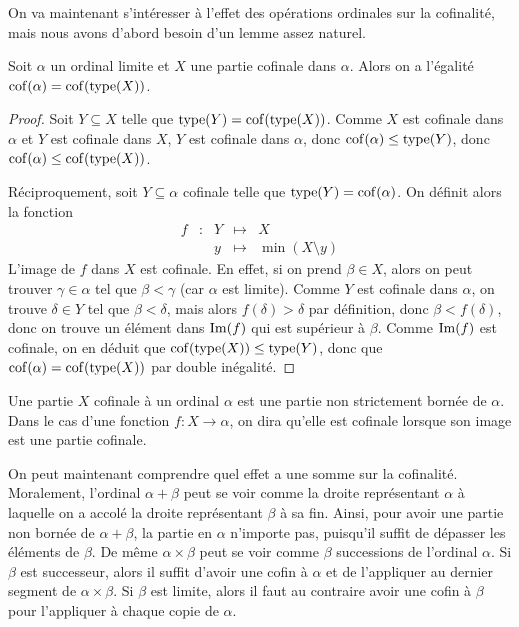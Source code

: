 On va maintenant s'intéresser à l'effet des opérations ordinales sur la
cofinalité, mais nous avons d'abord besoin d'un lemme assez naturel.

\begin{lemma}\label{lem.cof.type}
  Soit $\alpha$ un ordinal limite et $X$ une partie cofinale dans $\alpha$.
  Alors on a l'égalité $\operatorname{cof}(\alpha) = \operatorname{cof}(\operatorname{type}(X))$.
\end{lemma}

\begin{proof}
  Soit $Y\subseteq X$ telle que $\operatorname{type}(Y) = \operatorname{cof}(\operatorname{type}(X))$. Comme $X$ est
  cofinale dans $\alpha$ et $Y$ est cofinale dans $X$, $Y$ est cofinale dans
  $\alpha$, donc $\operatorname{cof}(\alpha) \leq \operatorname{type}(Y)$, donc
  $\operatorname{cof}(\alpha) \leq \operatorname{cof}(\operatorname{type}(X))$.

  Réciproquement, soit $Y\subseteq \alpha$ cofinale telle que
  $\operatorname{type}(Y) = \operatorname{cof}(\alpha)$. On définit alors la fonction
  \[\begin{array}{ccccc}
  f & : & Y & \longmapsto & X\\
  & & y &\longmapsto &\min (X\setminus y)
  \end{array}\]
  L'image de $f$ dans $X$ est cofinale. En effet, si on prend $\beta \in X$,
  alors on peut trouver $\gamma \in \alpha$ tel que $\beta < \gamma$ (car
  $\alpha$ est limite). Comme $Y$ est cofinale dans $\alpha$, on trouve
  $\delta \in Y$ tel que $\beta < \delta$, mais alors $f(\delta) > \delta$
  par définition, donc $\beta < f(\delta)$, donc on trouve un élément dans
  $\operatorname{Im}(f)$ qui est supérieur à $\beta$. Comme $\operatorname{Im}(f)$ est cofinale, on en
  déduit que $\operatorname{cof}(\operatorname{type}(X)) \leq \operatorname{type}(Y)$, donc que
  $\operatorname{cof}(\alpha) = \operatorname{cof}(\operatorname{type}(X))$ par double inégalité.
\end{proof}

\begin{remark}
  Une partie $X$ cofinale à un ordinal $\alpha$ est une partie non strictement
  bornée de $\alpha$. Dans le cas d'une fonction $f : X \to \alpha$, on dira
  qu'elle est cofinale lorsque son image est une partie cofinale.
\end{remark}

On peut maintenant comprendre quel effet a une somme sur la cofinalité.
Moralement, l'ordinal $\alpha + \beta$ peut se voir comme la droite représentant
$\alpha$ à laquelle on a accolé la droite représentant $\beta$ à sa fin. Ainsi,
pour avoir une partie non bornée de $\alpha + \beta$, la partie en $\alpha$
n'importe pas, puisqu'il suffit de dépasser les éléments de $\beta$. De même
$\alpha \times \beta$ peut se voir comme $\beta$ successions de l'ordinal
$\alpha$. Si $\beta$ est successeur, alors il suffit d'avoir une cofin à
$\alpha$ et de l'appliquer au dernier segment de $\alpha\times\beta$. Si
$\beta$ est limite, alors il faut au contraire avoir une cofin à $\beta$ pour
l'appliquer à chaque copie de $\alpha$.

